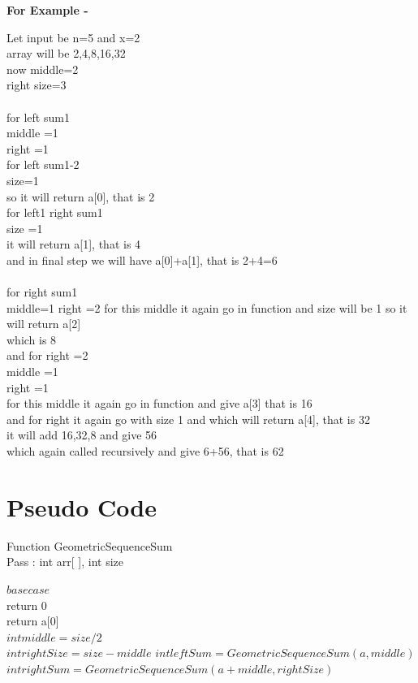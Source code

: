 \documentclass[conference]{IEEEtran}
\begin{document}
\begin{enumerate}
\textbf{For Example - }

Let input be
n=5 and x=2\\

array will be 2,4,8,16,32\\
now middle=2\\
right size=3\\\\
for left sum1\\
middle =1\\
right =1\\
for left sum1-2\\
size=1\\
so it will return a[0], that is 2\\
for left1 right sum1\\
size =1\\
it will return a[1], that is 4\\
and in final step we will have a[0]+a[1], that is 2+4=6\\\\

for right sum1\\
middle=1
right =2
for this middle it again go in function and size will be 1 so it will return a[2]\\
which is 8\\
and for right =2\\
middle =1\\
right =1\\
for this middle it again go in function and give a[3] that is 16\\
and for right it again go with size 1 and which will return a[4], that is 32\\
it will add 16,32,8 and give 56\\
which again called recursively and give 6+56, that is 62\\

\end{enumerate}

\section{\textbf{Pseudo Code}} 
\noindent Function GeometricSequenceSum \\
Pass : int arr[ ], int size\\
\begin{algorithmic}
    \STATE $base case$\\
	       return 0\\
            return a[0]\\
            \ENDIF
        \ENDELSEIF
    \STATE $int middle=size/2$\\
    \STATE $int rightSize=size-middle$
    \STATE $int leftSum=GeometricSequenceSum(a,middle)$
    \STATE $int rightSum=GeometricSequenceSum(a+middle,rightSize)$
\end{algorithmic}
\end{document}
